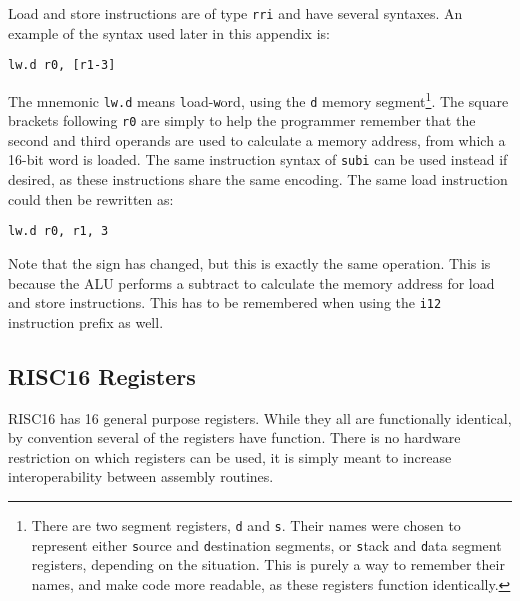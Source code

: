 Load and store instructions are of type \texttt{rri} and have several syntaxes.
An example of the syntax used later in this appendix is:

\begin{center}
\begin{minipage}{0.5\linewidth}
\texttt{lw.d r0, [r1-3]}
\end{minipage}
\end{center}

The mnemonic \texttt{lw.d} means \texttt{l}oad-\texttt{w}ord, using the
\texttt{d} memory segment\footnote{There are two segment registers, \texttt{d}
and \texttt{s}. Their names were chosen to represent either \texttt{s}ource and
\texttt{d}estination segments, or \texttt{s}tack and \texttt{d}ata segment
registers, depending on the situation. This is purely a way to remember their
names, and make code more readable, as these registers function identically.}.
The square brackets following \texttt{r0} are simply to help the programmer
remember that the second and third operands are used to calculate a memory
address, from which a 16-bit word is loaded. The same instruction syntax of
\texttt{subi} can be used instead if desired, as these instructions share the
same encoding. The same load instruction could then be rewritten as:

\begin{center}
\begin{minipage}{0.5\linewidth}
\texttt{lw.d r0, r1, 3}
\end{minipage}
\end{center}

Note that the sign has changed, but this is exactly the same operation. This is
because the ALU performs a subtract to calculate the memory address for load and
store instructions. This has to be remembered when using the \texttt{i12}
instruction prefix as well.


\subsection{RISC16 Registers}

RISC16 has 16 general purpose registers. While they all are functionally
identical, by convention several of the registers have function. There is no
hardware restriction on which registers can be used, it is simply meant to
increase interoperability between assembly routines.

